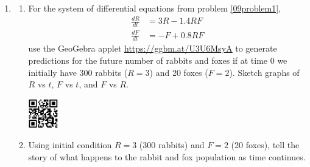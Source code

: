\begin{enumerate}

\item	\label{09problem4}
\begin{enumerate}
\item For the system of differential equations from problem \ref{09problem1},   
\begin{align*}
\frac{dR}{dt} &= 3R-1.4RF \\
\frac{dF}{dt} &= -F+0.8RF
\end{align*}
use the GeoGebra applet \href{https://ggbm.at/U3U6MsyA}{\underline{https://ggbm.at/U3U6MsyA}} to generate predictions for the future number of rabbits and foxes if at time 0 we initially have 300 rabbits ($R=3$) and 20 foxes ($F=2$). Sketch graphs of $R$ vs $t$, $F$ vs $t$, and $F$ vs $R$. \label{09problem4parta} \vfill

\vspace{-3.9in}\hspace{-0.75in}\includegraphics[width=0.5in]{11/11DEExplorerQR.png}
\vfill
\item Using initial condition $R = 3$ (300 rabbits) and $F = 2$ (20 foxes), tell the story of what happens to the rabbit and fox population as time continues. \label{09problem4partb}
\vfill
\end{enumerate}


\end{enumerate}
